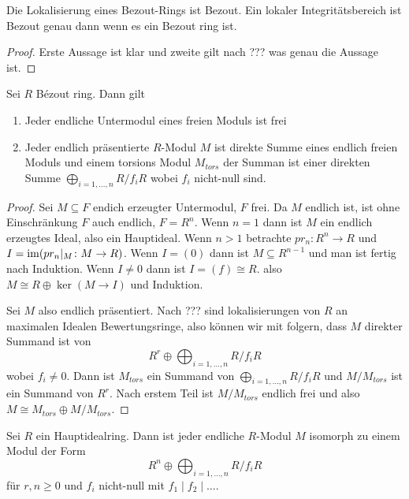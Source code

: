 \begin{Satz}
    Die Lokalisierung eines Bezout-Rings ist Bezout. Ein lokaler Integritätsbereich ist Bezout genau dann wenn es ein Bezout ring ist.
\end{Satz}
\begin{proof}
    Erste Aussage ist klar und zweite gilt nach ??? was genau die Aussage ist.
\end{proof}
\begin{Lemma}\label{Lem:StruktBezoutring}
    Sei \(R\) Bézout ring. Dann gilt 
    \begin{enumerate}
        \item Jeder endliche Untermodul eines freien Moduls ist frei
        \item Jeder endlich präsentierte \(R\)-Modul \(M\) ist direkte Summe eines endlich freien Moduls und einem torsions Modul \(M_{tors}\) der Summan ist einer direkten Summe \(\bigoplus_{i=1,\dots,n}R/f_iR\) wobei \(f_i\) nicht-null sind.
    \end{enumerate}
\end{Lemma}
\begin{proof}
    Sei \(M\subseteq F\) endich erzeugter Untermodul, \(F\) frei. Da \(M\) endlich ist, ist ohne Einschränkung \(F\) auch endlich, \(F=R^n\). Wenn \(n=1\) dann ist \(M\) ein endlich erzeugtes Ideal, also ein Hauptideal. Wenn \(n>1\) betrachte \(pr_n\colon R^n\to R\) und \(I=\operatorname{im}(pr_n|_M\colon M\to R)\). Wenn \(I=(0)\) dann ist \(M\subseteq R^{n-1}\) und man ist fertig nach Induktion. Wenn \(I\neq 0\) dann ist \(I=(f)\cong R\). also \(M\cong R\oplus \ker(M\to I)\) und Induktion.

    Sei \(M\) also endlich präsentiert. Nach ??? sind lokalisierungen von \(R\) an maximalen Idealen Bewertungsringe, also können wir mit  folgern, dass \(M\) direkter Summand ist von \[R^r\oplus\bigoplus_{i=1,\dots,n}R/f_iR\] wobei \(f_i\neq 0\). Dann ist \(M_{tors}\) ein Summand von \(\bigoplus_{i=1,\dots,n}R/f_iR\) und \(M/M_{tors}\) ist ein Summand von \(R^r\). Nach erstem Teil ist \(M/M_{tors}\) endlich frei und also \(M\cong M_{tors}\oplus M/M_{tors}\).
\end{proof}
\begin{Satz}\label{Satz:StruktEndlModPID}
Sei \(R\) ein Hauptidealring. Dann ist jeder endliche \(R\)-Modul \(M\) isomorph zu einem Modul der Form \[R^n\oplus\bigoplus_{i=1,\dots,n}R/f_iR\] für \(r,n\geq 0\) und \(f_i\) nicht-null mit \(f_1\mid f_2\mid\dots\).
    
\end{Satz}
